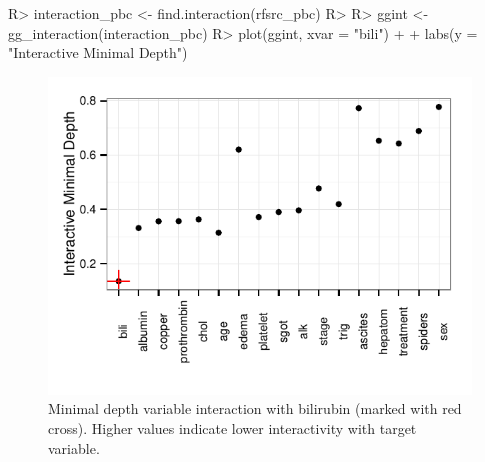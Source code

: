 \documentclass[nojss]{jss}
\begin{document}
\begin{Schunk}
\begin{Sinput}
R> interaction_pbc <- find.interaction(rfsrc_pbc)
R> 
R> ggint <- gg_interaction(interaction_pbc)
R> plot(ggint, xvar = "bili") + 
+   labs(y = "Interactive Minimal Depth")
\end{Sinput}
\end{Schunk}

\begin{Schunk}
\begin{figure}[!htpb]

{\centering \includegraphics[width=\maxwidth]{figure/rfs-interaction-1} 

}

\caption[Minimal depth variable interaction with bilirubin (marked with red cross)]{Minimal depth variable interaction with bilirubin (marked with red cross). Higher values indicate lower interactivity with target variable.\label{fig:interaction}}
\end{figure}
\end{Schunk}
\end{document}
